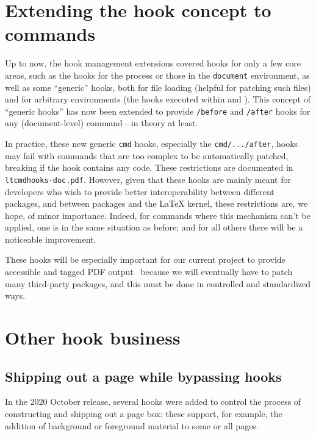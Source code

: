 \documentclass{ltnews}
\providecommand\hook[1]{\texttt{#1}}
\providecommand\env[1]{\texttt{#1}}
\providecommand\env[1]{\texttt{#1}}
\begin{document}
\section{Extending the hook concept to commands}

Up to now, the hook management extensions covered hooks for only a few
core areas, such as the hooks for the  process or those in
the \env{document} environment, as well as some \enquote {generic}
hooks, both for file loading (helpful for patching such files) and for
arbitrary environments (the hooks executed within  and
).  This concept of \enquote{generic hooks} has now been
extended to provide \hook{/before} and \hook{/after} hooks for any
(document-level) command---in theory at least.

In practice, these new generic \hook{cmd} hooks, especially the
\hook{cmd/.../after}, hooks may fail with commands that are too
complex to be automatically patched, breaking if the hook contains any
code.  These restrictions are documented in
\texttt{ltcmdhooks-doc.pdf}.
However, given that these hooks are mainly meant for developers who
wish to provide better interoperability between different packages,
and between packages and the \LaTeX{} kernel, these restrictions are,
we hope, of minor importance.  Indeed, for commands where this
mechanism can't be applied, one is in the same situation as before;
and for all others there will be a noticeable improvement.

These hooks will be especially important for our current project to
provide accessible and tagged PDF output~\cite{33:blueprint} because
we will eventually have to patch many third-party packages, and this
must be done in controlled and standardized ways.




\section{Other hook business}


\subsection{Shipping out a page while bypassing hooks}

In the 2020 October release, several hooks were added to control the
process of constructing and shipping out a page box: these support,
for example,
the addition of background or foreground material to some or all
pages.
 
\end{document}
